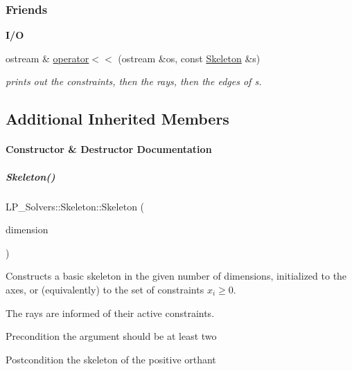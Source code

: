 \subsubsection*{Friends}
\begin{Indent}\textbf{ I/O}\par
\begin{DoxyCompactItemize}
\item 
ostream \& \hyperlink{group___c_l_s_solvers_a54f8dc187ec3e238ccc80d7a44b9ca82}{operator$<$$<$} (ostream \&os, const \hyperlink{group___c_l_s_solvers_class_l_p___solvers_1_1_skeleton}{Skeleton} \&s)
\begin{DoxyCompactList}\small\item\em prints out the constraints, then the rays, then the edges of {\ttfamily s}. \end{DoxyCompactList}\end{DoxyCompactItemize}
\end{Indent}
\subsection*{Additional Inherited Members}


\paragraph{Constructor \& Destructor Documentation}
\mbox{\label{group___c_l_s_solvers_ad9f2f64c49dbf96ebd30852e670e7642}} 
\subparagraph{\texorpdfstring{Skeleton()}{Skeleton()}\hspace{0.1cm}{\footnotesize\ttfamily [1/2]}}
{\footnotesize\ttfamily L\+P\+\_\+\+Solvers\+::\+Skeleton\+::\+Skeleton (\begin{DoxyParamCaption}\item[{N\+V\+A\+R\+\_\+\+T\+Y\+PE}]{dimension }\end{DoxyParamCaption})\hspace{0.3cm}{\ttfamily [explicit]}}



Constructs a basic skeleton in the given number of dimensions, initialized to the axes, or (equivalently) to the set of constraints $ x_i \geq 0 $. 

The rays are informed of their active constraints. \begin{DoxyPrecond}{Precondition}
the argument should be at least two 
\end{DoxyPrecond}
\begin{DoxyPostcond}{Postcondition}
the skeleton of the positive orthant 
\end{DoxyPostcond}


